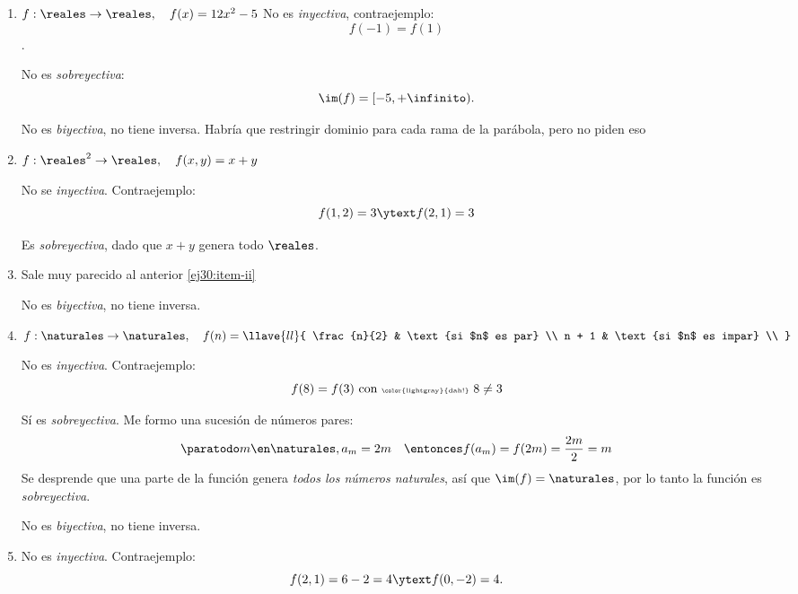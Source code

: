 \begin{enumerate}[label=\roman*)]
  \item
        $f: \reales \to \reales,\quad f(x) = 12 x^2 - 5$
        No es \textit{inyectiva}, contraejemplo:
        $$
          f(-1) = f(1)
        $$.

        No es \textit{sobreyectiva}:
        $$
          \im(f) = [-5, +\infinito).
        $$

        No es \textit{biyectiva}, no tiene inversa. Habría que restringir dominio para cada rama de la parábola, pero no piden eso 

  \item\label{ej30:item-ii}
        $f: \reales^2 \to \reales,\quad f(x,y) = x + y$

        No se \textit{inyectiva}. Contraejemplo:
        $$
          f(1,2) = 3 \ytext f(2,1) = 3
        $$

        Es \textit{sobreyectiva}, dado que $x + y$ genera todo $\reales$.

  \item Sale muy parecido al anterior \ref{ej30:item-ii}

        No es \textit{biyectiva}, no tiene inversa.

  \item $f: \naturales \to \naturales,\quad
          f(n) =
          \llave{ll}{
            \frac{n}{2} & \text{si $n$ es par}   \\
            n + 1       & \text{si $n$ es impar} \\
          }$\par

        No es \textit{inyectiva}. Contraejemplo:
        $$
          f(8) = f(3) \text{ con {\tiny \color{lightgray}{dah!}} } 8 \neq 3
        $$

        Sí es \textit{sobreyectiva}. Me formo una sucesión de números pares:
        $$
          \paratodo m \en \naturales, a_m = 2m
          \quad\entonces
          f(a_m) = f(2m) = \frac{2m}{2} = m
        $$
        Se desprende que una parte de la función genera \textit{todos los números naturales},
        así que $\im(f) = \naturales$, por lo tanto la función es \textit{sobreyectiva}.

        No es \textit{biyectiva}, no tiene inversa.

  \item No es \textit{inyectiva}. Contraejemplo:
        $$
          f(2,1) = 6 - 2 = 4 \ytext f(0,-2) = 4.
        $$


\end{enumerate}
